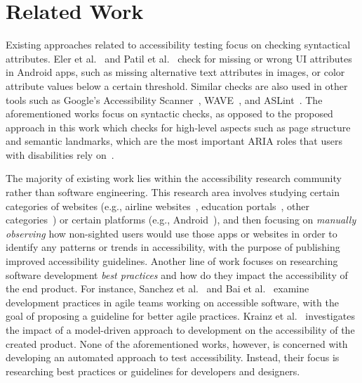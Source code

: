 \section{Related Work}

Existing approaches related to accessibility testing focus on checking 
syntactical attributes. 
Eler et al.~\cite{eler2018automated} and Patil et al.~\cite{patil2016enhanced} 
check for missing or wrong UI attributes in Android apps, 
such as missing alternative 
text attributes in images, or color attribute values 
below a certain threshold. 
Similar checks are also used in other tools such as 
Google's Accessibility Scanner~\cite{goog_scanner}, 
WAVE~\cite{wave_tool}, and ASLint~\cite{aslint_tool}.
The aforementioned works focus on syntactic checks, 
as opposed to the proposed approach in this work which 
checks for high-level aspects such as page structure and semantic 
landmarks, which are the most important ARIA roles that users 
with disabilities rely on~\cite{2019users_survey}. 

The majority of existing work lies within the 
accessibility research community 
rather than software engineering.
This research area involves studying certain categories of websites 
(e.g., airline websites~\cite{agrawal2019evaluating,dominguez2018website}, 
education portals~\cite{kimmons2017open}, 
other categories~\cite{bhagat2019evaluation,ross2018examining,snider2020accessibility,serra2015accessibility}) or 
certain platforms (e.g., Android~\cite{alshayban2020accessibility,park2014toward,yan2019current}), 
and then focusing on \emph{manually observing} how non-sighted users 
would use those apps or websites in order to 
identify any patterns or trends in accessibility, with the 
purpose of publishing improved accessibility guidelines. 
Another line of work focuses on researching software development 
\emph{best practices} and how do they impact the accessibility 
of the end product. 
For instance, Sanchez et al.~\cite{sanchez2017method} and 
Bai et al.~\cite{bai2018categorization, bai2019methods} 
examine development practices in 
agile teams working on accessible software, 
with the goal of proposing a guideline 
for better agile practices. 
Krainz et al.~\cite{krainz2018can} investigates 
the impact of a model-driven approach to development 
on the accessibility of the created product.
None of the aforementioned works, however, is concerned 
with developing an automated approach to test accessibility.
Instead, their focus is researching best practices or guidelines for
developers and designers.

